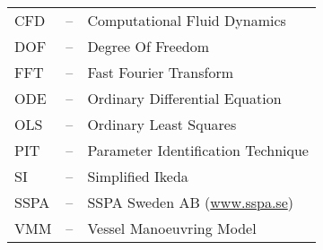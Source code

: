 
\begin{tabular}{ l c l }
CFD & -- & Computational Fluid Dynamics\\
DOF & -- & Degree Of Freedom\\
FFT & -- & Fast Fourier Transform\\
ODE & -- & Ordinary Differential Equation\\
OLS & -- & Ordinary Least Squares\\
PIT & -- & Parameter Identification Technique\\
SI  & -- & Simplified Ikeda\\
SSPA & -- & SSPA Sweden AB (\url{www.sspa.se})\\
VMM & -- & Vessel Manoeuvring Model\\

\end{tabular}
